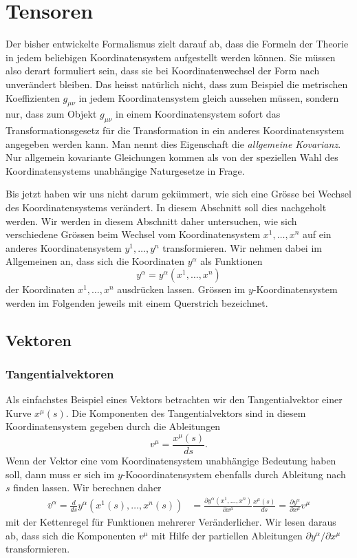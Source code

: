 %
%
%
\section{Tensoren}
Der bisher entwickelte Formalismus zielt darauf ab, dass die Formeln der
Theorie in jedem beliebigen Koordinatensystem aufgestellt werden können.
Sie müssen also derart formuliert sein, dass sie bei Koordinatenwechsel
der Form nach unverändert bleiben.
Das heisst natürlich nicht, dass zum Beispiel die metrischen Koeffizienten
$g_{\mu\nu}$ in jedem Koordinatensystem gleich aussehen müssen, sondern
nur, dass zum Objekt $g_{\mu\nu}$ in einem Koordinatensystem sofort
das Transformationsgesetz für die Transformation in ein anderes
Koordinatensystem angegeben werden kann.
Man nennt dies Eigenschaft die {\em allgemeine Kovarianz}.
%
%
Nur allgemein kovariante Gleichungen kommen als von der speziellen
Wahl des Koordinatensystems unabhängige Naturgesetze in Frage.

Bis jetzt haben wir uns nicht darum gekümmert, wie sich eine Grösse
bei Wechsel des Koordinatensystems verändert.
In diesem Abschnitt soll dies nachgeholt werden.
Wir werden in diesem Abschnitt daher untersuchen, wie sich verschiedene
Grössen beim Wechsel vom Koordinatensystem $x^1,\dots,x^n$ auf ein
anderes Koordinatensystem $y^1,\dots,y^n$ transformieren.
Wir nehmen dabei im Allgemeinen an, dass sich die Koordinaten $y^\alpha$
als Funktionen
\[
y^\alpha = y^\alpha(x^1,\dots,x^n)
\]
der Koordinaten $x^1,\dots,x^n$ ausdrücken lassen.
Grössen im $y$-Koordinatensystem werden im Folgenden jeweils mit
einem Querstrich bezeichnet.

\subsection{Vektoren}

\subsubsection{Tangentialvektoren}
Als einfachstes Beispiel eines Vektors betrachten wir den Tangentialvektor
einer Kurve $x^\mu(s)$.
Die Komponenten des Tangentialvektors sind in diesem Koordinatensystem
gegeben durch die Ableitungen
\[
v^\mu
=
\frac{x^\mu(s)}{ds}.
\]
Wenn der Vektor eine vom Koordinatensystem unabhängige Bedeutung haben soll,
dann muss er sich im $y$-Kooordinatensystem ebenfalls durch Ableitung nach
$s$ finden lassen.
Wir berechnen daher 
\begin{align}
\bar v^\alpha
=
\frac{d}{ds}y^\alpha(x^1(s),\dots,x^n(s))
&=
\frac{\partial y^\alpha(x^1,\dots,x^n)}{\partial x^\mu}\frac{x^\mu(s)}{ds}
=
\frac{\partial y^\alpha}{\partial x^\mu} v^\mu
\label{skript:trafo:kontra}
\end{align}
mit der Kettenregel für Funktionen mehrerer Veränderlicher.
Wir lesen daraus ab, dass sich die Komponenten $v^\mu$ mit Hilfe der
partiellen Ableitungen $\partial y^\alpha/\partial x^\mu$ transformieren.

